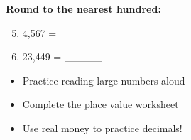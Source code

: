 \documentclass[a4paper,11pt]{article}
\begin{document}
\textbf{Round to the nearest hundred:}
\begin{enumerate}
    \setcounter{enumi}{4}
    \item 4,567 = \_\_\_\_\_
    \item 23,449 = \_\_\_\_\_
\end{enumerate}

\vspace{1cm}

\begin{tcolorbox}[colback=gray!10!white,colframe=gray!50!black,title=\textbf{Homework Reminder}]
\begin{itemize}
    \item Practice reading large numbers aloud
    \item Complete the place value worksheet
    \item Use real money to practice decimals!
\end{itemize}
\end{tcolorbox}
\end{document}
